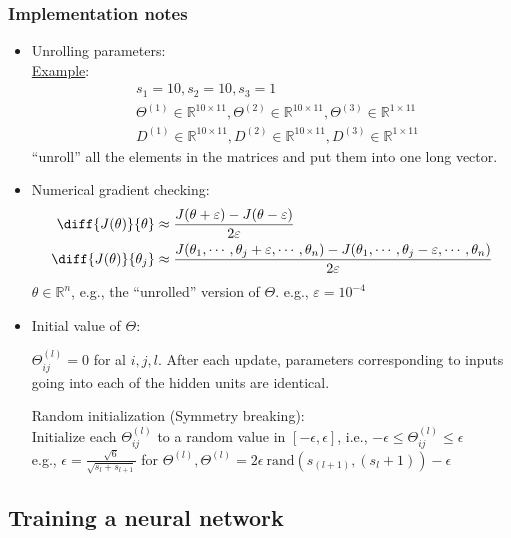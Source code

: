 \subsubsection{Implementation notes}
\begin{itemize}
\item
    Unrolling parameters:\\
    \underline{Example}:\\
    \begin{align*}
    &s_1 = 10, s_2 = 10, s_3 = 1\\
    &\Theta^{(1)} \in \mathbb{R}^{10 \times 11}, \Theta^{(2)} \in \mathbb{R}^{10 \times 11}, \Theta^{(3)} \in \mathbb{R}^{1 \times 11}\\
    &D^{(1)} \in \mathbb{R}^{10 \times 11}, D^{(2)} \in \mathbb{R}^{10 \times 11}, D^{(3)} \in \mathbb{R}^{1 \times 11}
    \end{align*}
    ``unroll'' all the elements in the matrices and put them into one long vector.
\item
    Numerical gradient checking:\\
    \begin{align*}
    \diff{J(\theta)}{\theta} & \approx \frac{J(\theta + \varepsilon)-J(\theta - \varepsilon)}{2 \varepsilon}\\
    \diff{J(\theta)}{{\theta_j}} & \approx \frac{J(\theta_1, \cdots, \theta_j + \varepsilon, \cdots, \theta_n)-J(\theta_1, \cdots, \theta_j - \varepsilon, \cdots, \theta_n)}{2 \varepsilon}
    \end{align*}
    $\theta \in \mathbb{R}^n$, e.g., the ``unrolled'' version of $\Theta$. e.g., $\varepsilon = 10^{-4}$
\item
    Initial value of $\Theta$:
    
    $\Theta_{ij}^{(l)} = 0$ for al $i, j, l$. After each update, parameters corresponding to inputs going into each of the hidden units are identical.

    Random initialization (Symmetry breaking):\\
    Initialize each $\Theta_{ij}^{(l)}$ to a random value in $[-\epsilon, \epsilon]$, i.e., $-\epsilon \leq \Theta_{ij}^{(l)} \leq \epsilon$\\
    e.g., $\epsilon = \frac{\sqrt{6}}{\sqrt{s_l + s_{l+1}}}$ for $\Theta^{(l)}, \Theta^{(l)} = 2\epsilon~\text{rand}(s_{(l+1)}, (s_{l}+1))-\epsilon$
\end{itemize}

%
\subsection{Training a neural network}

